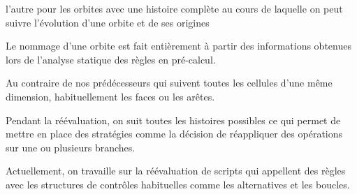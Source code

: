 \documentclass[11pt]{article}
\begin{document}
l'autre pour les orbites avec une histoire complète au cours de laquelle on peut
suivre l'évolution d'une orbite et de ses origines

Le nommage d'une orbite est fait entièrement à partir des informations obtenues
lors de l'analyse statique des règles en pré-calcul.

Au contraire de nos prédécesseurs qui suivent toutes les cellules d'une même
dimension, habituellement les faces ou les arêtes.

Pendant la réévaluation, on suit toutes les histoires possibles ce qui permet de
mettre en place des stratégies comme la décision de réappliquer des opérations
sur une ou plusieurs branches.

Actuellement, on travaille sur la réévaluation de scripts qui appellent des
règles avec les structures de contrôles habituelles comme les alternatives et
les boucles.
\end{document}
